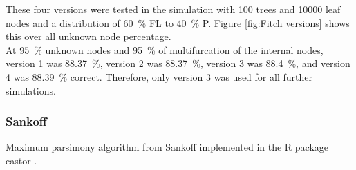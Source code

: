         These four versions were tested in the simulation with 100 trees and 10000 leaf nodes and a
          distribution of 60~\% FL to 40~\% P. Figure \ref{fig:Fitch versions} shows this over all unknown 
          node percentage. \\
        At 95~\% unknown nodes and 95~\% of multifurcation of the internal nodes, version 1 was 88.37~\%, 
          version 2 was 88.37~\%, version 3 was 88.4~\%, and version 4 was 88.39~\% correct. Therefore, 
          only version 3 was used for all further simulations.
          


      \subsubsection{Sankoff}
        Maximum parsimony algorithm from Sankoff implemented in the R package castor \cite{Louca2017}. \\



